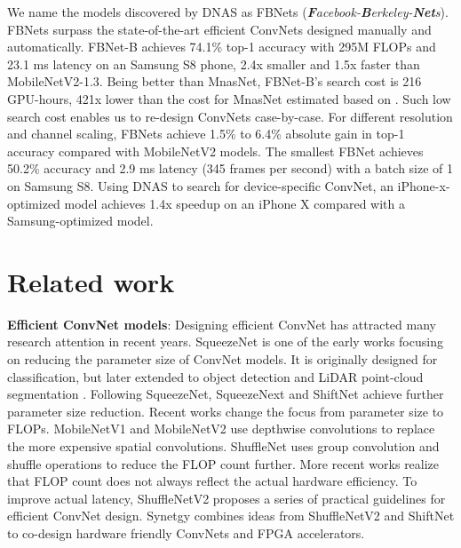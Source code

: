 \documentclass[10pt,twocolumn,letterpaper]{article}
\begin{document}
We name the models discovered by DNAS as FBNets (\textit{\textbf{F}acebook-\textbf{B}erkeley-\textbf{Net}s}). FBNets surpass the state-of-the-art efficient ConvNets designed manually and automatically. FBNet-B achieves 74.1\% top-1 accuracy with 295M FLOPs and 23.1 ms latency on an Samsung S8 phone, 2.4x smaller and 1.5x faster than MobileNetV2-1.3. Being better than MnasNet, FBNet-B's search cost is 216 GPU-hours, 421x lower than the cost for MnasNet estimated based on \cite{tan2018mnasnet}. Such low search cost enables us to re-design ConvNets case-by-case. For different resolution and channel scaling, FBNets achieve 1.5\% to 6.4\% absolute gain in top-1 accuracy compared with MobileNetV2 models. The smallest FBNet achieves 50.2\% accuracy and 2.9 ms latency (345 frames per second) with a batch size of 1 on Samsung S8. Using DNAS to search for device-specific ConvNet, an iPhone-x-optimized model achieves 1.4x speedup on an iPhone X compared with a Samsung-optimized model. 



\section{Related work}
\textbf{Efficient ConvNet models}: Designing efficient ConvNet has attracted many research attention in recent years. SqueezeNet \cite{iandola2016squeezenet} is one of the early works focusing on reducing the parameter size of ConvNet models. It is originally designed for classification, but later extended to object detection \cite{wu2017squeezedet} and LiDAR point-cloud segmentation \cite{wu2018squeezeseg, wu2018squeezesegv2}. Following SqueezeNet, SqueezeNext \cite{gholami2018squeezenext} and ShiftNet \cite{wu2017shift} achieve further parameter size reduction. Recent works change the focus from parameter size to FLOPs. MobileNetV1 and MobileNetV2 \cite{howard2017mobilenets, sandler2018mobilenetv2} use depthwise convolutions to replace the more expensive spatial convolutions. ShuffleNet \cite{zhang1707shufflenet} uses group convolution and shuffle operations to reduce the FLOP count further. More recent works realize that FLOP count does not always reflect the actual hardware efficiency. To improve actual latency, ShuffleNetV2 \cite{ma2018shufflenet} proposes a series of practical guidelines for efficient ConvNet design. Synetgy \cite{yang2018synetgy} combines ideas from ShuffleNetV2 and ShiftNet to co-design hardware friendly ConvNets and FPGA accelerators. 
\end{document}
